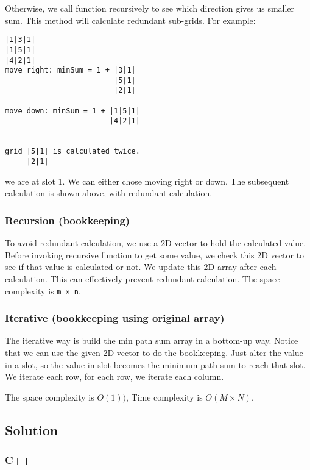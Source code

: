 \documentclass[12pt]{article}
\begin{document}
Otherwise, we call function recursively to see which direction gives us smaller sum. This method will calculate redundant sub-grids. For example:
\begin{verbatim}
|1|3|1|
|1|5|1|
|4|2|1|
move right: minSum = 1 + |3|1|
                         |5|1|
                         |2|1|
                         
move down: minSum = 1 + |1|5|1|
                        |4|2|1|
                        

grid |5|1| is calculated twice.
     |2|1|

\end{verbatim}
we are at slot 1. We can either chose moving right or down. The subsequent calculation is shown above, with redundant calculation.
\subsubsection{Recursion (bookkeeping)}
\label{sec:org2ae1050}
To avoid redundant calculation, we use a 2D vector to hold the calculated value. Before invoking recursive function to get some value, we check this 2D vector to see if that value is calculated or not. We update this 2D array after each calculation. This can effectively prevent redundant calculation. The space complexity is \texttt{m × n}.
\subsubsection{Iterative (bookkeeping using original array)}
\label{sec:org82010e8}
The iterative way is build the min path sum array in a bottom-up way. Notice that we can use the given 2D vector to do the bookkeeping. Just alter the value in a slot, so the value in slot becomes the minimum path sum to reach that slot. We iterate each row, for each row, we iterate each column.

The space complexity is \(O(1))\), Time complexity is \(O(M \times N)\).

\subsection{Solution}
\label{sec:orgd923e08}
\subsubsection{C++}
\label{sec:orgf37a927}
\end{document}
